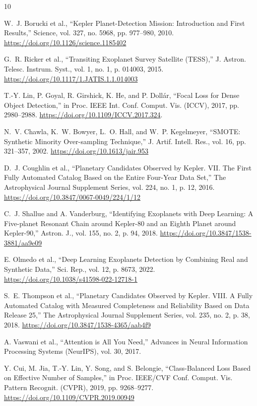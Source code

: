 \documentclass[preprint,11pt,times]{elsarticle}
\begin{document}
\begin{thebibliography}{10}

W.~J. Borucki et al., ``Kepler Planet-Detection Mission: Introduction and First Results,'' Science, vol. 327, no. 5968, pp. 977--980, 2010. \url{https://doi.org/10.1126/science.1185402}

G.~R. Ricker et al., ``Transiting Exoplanet Survey Satellite (TESS),'' J. Astron. Telesc. Instrum. Syst., vol. 1, no. 1, p. 014003, 2015. \url{https://doi.org/10.1117/1.JATIS.1.1.014003}

T.-Y. Lin, P. Goyal, R. Girshick, K. He, and P. Doll\'ar, ``Focal Loss for Dense Object Detection,'' in Proc. IEEE Int. Conf. Comput. Vis. (ICCV), 2017, pp. 2980--2988. \url{https://doi.org/10.1109/ICCV.2017.324}.

N.~V. Chawla, K.~W. Bowyer, L.~O. Hall, and W.~P. Kegelmeyer, ``SMOTE: Synthetic Minority Over-sampling Technique,'' J. Artif. Intell. Res., vol. 16, pp. 321--357, 2002. \url{https://doi.org/10.1613/jair.953}

D.~J. Coughlin et al., ``Planetary Candidates Observed by Kepler. VII. The First Fully Automated Catalog Based on the Entire Four-Year Data Set,'' 
The Astrophysical Journal Supplement Series, vol. 224, no. 1, p. 12, 2016.
\url{https://doi.org/10.3847/0067-0049/224/1/12}

C.~J. Shallue and A. Vanderburg, ``Identifying Exoplanets with Deep Learning: A Five-planet Resonant Chain around Kepler-80 and an Eighth Planet around Kepler-90,'' Astron. J., vol. 155, no. 2, p. 94, 2018. \url{https://doi.org/10.3847/1538-3881/aa9e09}

E. Olmedo et al., ``Deep Learning Exoplanets Detection by Combining Real and Synthetic Data,'' Sci. Rep., vol. 12, p. 8673, 2022. \url{https://doi.org/10.1038/s41598-022-12718-1}

S.~E. Thompson et al., ``Planetary Candidates Observed by Kepler. VIII. A Fully Automated Catalog with Measured Completeness and Reliability Based on Data Release 25,'' 
The Astrophysical Journal Supplement Series, vol. 235, no. 2, p. 38, 2018.
\url{https://doi.org/10.3847/1538-4365/aab4f9}

A. Vaswani et al., ``Attention is All You Need,'' Advances in Neural Information Processing Systems (NeurIPS), vol. 30, 2017.

Y. Cui, M. Jia, T.-Y. Lin, Y. Song, and S. Belongie, ``Class-Balanced Loss Based on Effective Number of Samples,'' in Proc. IEEE/CVF Conf. Comput. Vis. Pattern Recognit. (CVPR), 2019, pp. 9268--9277. \url{https://doi.org/10.1109/CVPR.2019.00949}


\end{thebibliography}
\end{document}
